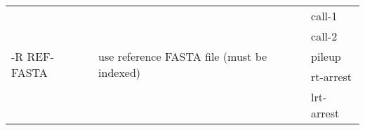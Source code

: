 {\small
\begin{tabular}{@{}p{}p{}l@{}}
\multirow{5}{=}{-R REF-FASTA} & \multirow{5}{=}{use reference FASTA file (must be indexed)} & call-1 \\
 &  & call-2 \\
 &  & pileup \\
 &  & rt-arrest \\
 &  & lrt-arrest \\
\end{tabular}\\
}
